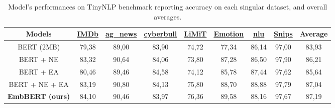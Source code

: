 \begin{table*}[htbp]
    \caption{Model's performances on TinyNLP benchmark reporting accuracy on each singular dataset, and overall averages.}
    \begin{center}    
    
        \begin{tabular}{| c | c  c  c  c  c  c  c | c |}
        \hline
        \textbf{Models}&
        \href{https://huggingface.co/datasets/stanfordnlp/imdb}{\textbf{IMDb}} &
        \href{https://huggingface.co/datasets/fancyzhx/ag_news}{\textbf{ag\_news}}  &
        \href{https://www.kaggle.com/datasets/andrewmvd/cyberbullying-classification}{\textbf{cyberbull}}  &
        \href{https://huggingface.co/datasets/IBM/limit}{\textbf{LiMiT}} &
        \href{https://huggingface.co/datasets/dair-ai/emotion}{\textbf{Emotion}} &
        \href{https://huggingface.co/datasets/xingkunliuxtracta/nlu_evaluation_data}{\textbf{nlu}} &
        \href{https://huggingface.co/datasets/benayas/snips}{\textbf{Snips}} &
        \textbf{Average} \\
        \hline

        BERT (2MB) & 79,38 & 89,00 & 83,90 & 74,72 & 77,34 & 86,14 & 97,00 & 83,93 \\
        \hline

        BERT + NE \cite{NanoBERT}       & 83,32 & 90,64 & 84,06 & 73,80 & 87,28 & 86,50 & 97,90 & 86,21 \\
        \hline
        BERT + EA \cite{efficient_attention}       & 80,46 & 89,46 & 84,58 & 74,12 & 85,78 & 87,44 &  97,62 & 85,64 \\
        \hline
        BERT + NE + EA          & 83,19 & 90,80 & 84,13 & 75,80 & 88,70 & 88,88 & 97,79 & 87,04\\
        \hline \hline
        \textbf{EmbBERT (ours)} & 84,10 & 90,46 & 83,97 & 76,36 & 89,58 & 88,16 & 97,67 & 87,19 \\

        \hline
        \end{tabular}

    \label{table:res_tiny_abl}
    \end{center}
    
\end{table*}


